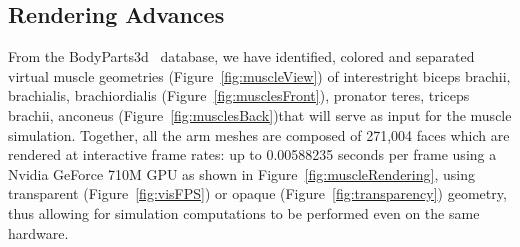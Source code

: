 \subsection{Rendering Advances}

From the BodyParts3d~\citep{bodyParts3d} database, we have identified, colored and separated virtual muscle geometries (Figure~\ref{fig:muscleView}) of interest\textemdash right biceps brachii, brachialis, brachiordialis (Figure~\ref{fig:musclesFront}), pronator teres, triceps brachii, anconeus (Figure~\ref{fig:musclesBack})\textemdash that will serve as input for the muscle simulation. Together, all the arm meshes are composed of 271,004 faces which are rendered at interactive frame rates: up to 0.00588235 seconds per frame using a Nvidia GeForce 710M GPU as shown in Figure~\ref{fig:muscleRendering}, using transparent (Figure~\ref{fig:visFPS}) or opaque (Figure~\ref{fig:transparency}) geometry, thus allowing for simulation computations to be performed even on the same hardware.


